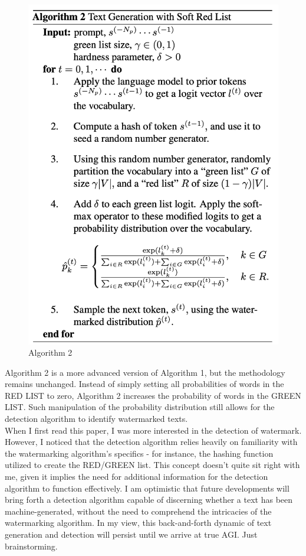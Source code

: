 \documentclass{article}
\begin{document}
\begin{figure}[H]
	\centering
	\includegraphics[width=1.0\linewidth]{images/watermark_2}
	\caption{Algorithm 2}
	\label{fig:watermark2}
\end{figure}
Algorithm 2 is a more advanced version of Algorithm 1, but the methodology remains unchanged. Instead of simply setting all probabilities of words in the RED LIST to zero, Algorithm 2 increases the probability of words in the GREEN LIST. Such manipulation of the probability distribution still allows for the detection algorithm to identify watermarked texts.\\

When I first read this paper, I was more interested in the detection of watermark. However, I noticed that the detection algorithm relies heavily on familiarity with the watermarking algorithm's specifics - for instance, the hashing function utilized to create the RED/GREEN list. This concept doesn't quite sit right with me, given it implies the need for additional information for the detection algorithm to function effectively. I am optimistic that future developments will bring forth a detection algorithm capable of discerning whether a text has been machine-generated, without the need to comprehend the intricacies of the watermarking algorithm. In my view, this back-and-forth dynamic of text generation and detection will persist until we arrive at true AGI. Just brainstorming.



\end{document}
